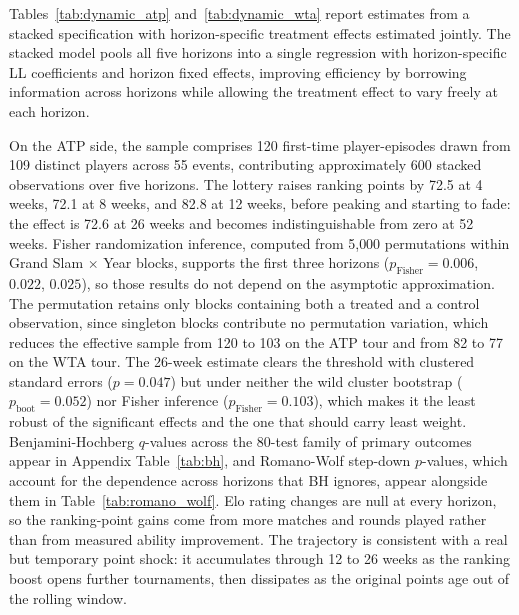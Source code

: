 Tables~\ref{tab:dynamic_atp} and~\ref{tab:dynamic_wta} report estimates from a stacked specification with horizon-specific treatment effects estimated jointly. The stacked model pools all five horizons into a single regression with horizon-specific LL coefficients and horizon fixed effects, improving efficiency by borrowing information across horizons while allowing the treatment effect to vary freely at each horizon.

On the ATP side, the sample comprises 120 first-time player-episodes drawn from 109 distinct players across 55 events, contributing approximately 600 stacked observations over five horizons. The lottery raises ranking points by 72.5 at 4 weeks, 72.1 at 8 weeks, and 82.8 at 12 weeks, before peaking and starting to fade: the effect is 72.6 at 26 weeks and becomes indistinguishable from zero at 52 weeks. Fisher randomization inference, computed from 5{,}000 permutations within Grand Slam $\times$ Year blocks, supports the first three horizons ($p_{\text{Fisher}} = 0.006$, $0.022$, $0.025$), so those results do not depend on the asymptotic approximation. The permutation retains only blocks containing both a treated and a control observation, since singleton blocks contribute no permutation variation, which reduces the effective sample from 120 to 103 on the ATP tour and from 82 to 77 on the WTA tour. The 26-week estimate clears the threshold with clustered standard errors ($p = 0.047$) but under neither the wild cluster bootstrap ($p_{\text{boot}} = 0.052$) nor Fisher inference ($p_{\text{Fisher}} = 0.103$), which makes it the least robust of the significant effects and the one that should carry least weight. Benjamini-Hochberg $q$-values across the 80-test family of primary outcomes appear in Appendix Table~\ref{tab:bh}, and Romano-Wolf step-down $p$-values, which account for the dependence across horizons that BH ignores, appear alongside them in Table~\ref{tab:romano_wolf}. Elo rating changes are null at every horizon, so the ranking-point gains come from more matches and rounds played rather than from measured ability improvement. The trajectory is consistent with a real but temporary point shock: it accumulates through 12 to 26 weeks as the ranking boost opens further tournaments, then dissipates as the original points age out of the rolling window.

